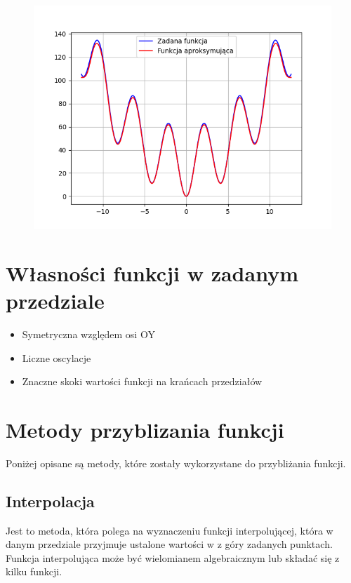 \documentclass{article}
\begin{document}
\begin{figure}[H]
  \centering
  \begin{minipage}[b]{0.5\textwidth}
    \includegraphics[width=\textwidth]{zadana_funkcja.png}
  \end{minipage}
\end{figure}

\newpage

\section{Własności funkcji w zadanym przedziale}

\begin{itemize}
    \item Symetryczna względem osi OY
    \item Liczne oscylacje
    \item Znaczne skoki wartości funkcji na krańcach przedziałów
\end{itemize}

\section{Metody przyblizania funkcji}

Poniżej opisane są metody, które zostały wykorzystane do przybliżania funkcji.

\subsection{Interpolacja}

Jest to metoda, która polega na wyznaczeniu funkcji interpolującej, która w danym przedziale przyjmuje ustalone wartości w z góry zadanych punktach. Funkcja interpolująca może być wielomianem algebraicznym lub składać się z kilku funkcji.
\end{document}
